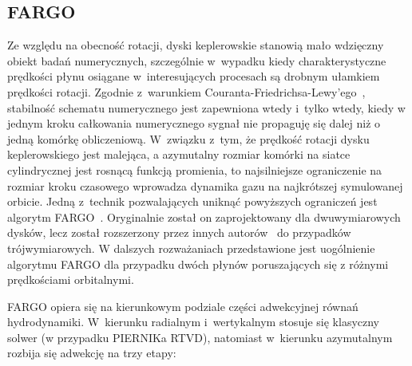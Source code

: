 
\subsection{FARGO}
Ze względu na obecność rotacji, dyski keplerowskie stanowią mało wdzięczny
obiekt badań numerycznych, szczególnie w~wypadku kiedy charakterystyczne
prędkości płynu osiągane w~interesujących procesach są drobnym ułamkiem
prędkości rotacji. Zgodnie z~warunkiem Couranta-Friedrichsa-Lewy'ego~\cite{cir},
stabilność schematu numerycznego jest zapewniona wtedy i~tylko wtedy, kiedy w
jednym kroku całkowania numerycznego sygnał nie propaguję się dalej niż o jedną
komórkę obliczeniową. W~związku z~tym, że prędkość rotacji dysku keplerowskiego
jest malejąca, a azymutalny rozmiar komórki na siatce cylindrycznej jest rosnącą
funkcją promienia, to najsilniejsze ograniczenie na rozmiar kroku czasowego
wprowadza dynamika gazu na najkrótszej symulowanej orbicie. Jedną z~technik
pozwalających uniknąć powyższych ograniczeń jest algorytm FARGO~\citep{M00}.
Oryginalnie został on zaprojektowany dla dwuwymiarowych dysków, lecz został
rozszerzony przez innych autorów~\cite{KBK09} do przypadków trójwymiarowych.  W
dalszych rozważaniach przedstawione jest uogólnienie algorytmu FARGO dla
przypadku dwóch płynów poruszających się z różnymi prędkościami orbitalnymi.
%
\par FARGO opiera się na kierunkowym podziale części adwekcyjnej równań
hydrodynamiki. W~kierunku radialnym i~wertykalnym stosuje się klasyczny solwer
(w przypadku PIERNIKa RTVD), natomiast w~kierunku azymutalnym rozbija się
adwekcję na trzy etapy:
